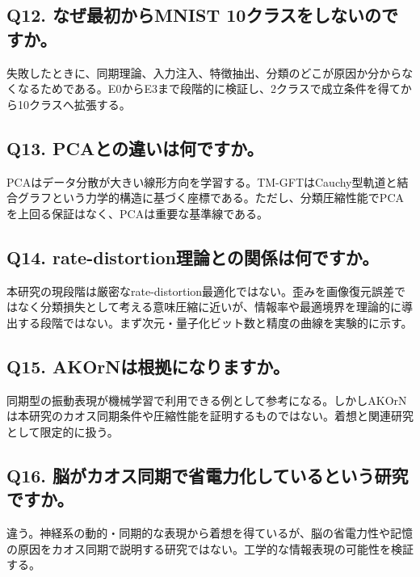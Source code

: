 \documentclass[11pt,a4paper]{ltjsarticle}
\begin{document}
\subsection*{\textcolor{researchblue}{Q12. なぜ最初からMNIST 10クラスをしないのですか。}}

失敗したときに、同期理論、入力注入、特徴抽出、分類のどこが原因か分からなくなるためである。E0からE3まで段階的に検証し、2クラスで成立条件を得てから10クラスへ拡張する。\par

\subsection*{\textcolor{researchblue}{Q13. PCAとの違いは何ですか。}}

PCAはデータ分散が大きい線形方向を学習する。TM-GFTはCauchy型軌道と結合グラフという力学的構造に基づく座標である。ただし、分類圧縮性能でPCAを上回る保証はなく、PCAは重要な基準線である。\par

\subsection*{\textcolor{researchblue}{Q14. rate-distortion理論との関係は何ですか。}}

本研究の現段階は厳密なrate-distortion最適化ではない。歪みを画像復元誤差ではなく分類損失として考える意味圧縮に近いが、情報率や最適境界を理論的に導出する段階ではない。まず次元・量子化ビット数と精度の曲線を実験的に示す。\par

\subsection*{\textcolor{researchblue}{Q15. AKOrNは根拠になりますか。}}

同期型の振動表現が機械学習で利用できる例として参考になる。しかしAKOrNは本研究のカオス同期条件や圧縮性能を証明するものではない。着想と関連研究として限定的に扱う。\par

\subsection*{\textcolor{researchblue}{Q16. 脳がカオス同期で省電力化しているという研究ですか。}}

違う。神経系の動的・同期的な表現から着想を得ているが、脳の省電力性や記憶の原因をカオス同期で説明する研究ではない。工学的な情報表現の可能性を検証する。\par
\end{document}
